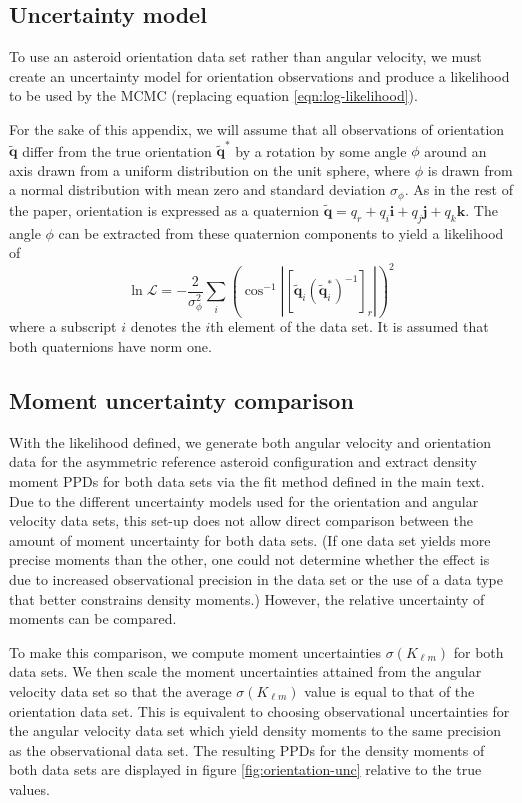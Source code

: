 \documentclass[fleqn,usenatbib]{mnras}
\newcommand{\parens}[1]{\left( #1 \right)}
\newcommand{\brackets}[1]{\left[ #1 \right]}
\newcommand{\quat}[1]{\widetilde{\bm{#1}}}
\begin{document}
\subsection{Uncertainty model}
To use an asteroid orientation data set rather than angular velocity, we must create an uncertainty model for orientation observations and produce a likelihood to be used by the MCMC (replacing equation \ref{eqn:log-likelihood}).

For the sake of this appendix, we will assume that all observations of orientation $\quat q$ differ from the true orientation $\quat q^*$ by a rotation by some angle $\phi$ around an axis drawn from a uniform distribution on the unit sphere, where $\phi$ is drawn from a normal distribution with mean zero and standard deviation $\sigma_\phi$. As in the rest of the paper, orientation is expressed as a quaternion $\quat q = q_r + q_i \bm i + q_j \bm j + q_k \bm k$. The angle $\phi$ can be extracted from these quaternion components to yield a likelihood of
\begin{equation}
  \ln \mathcal{L} = -\frac{2}{\sigma_\phi^2}\sum_{i}\parens{\cos^{-1}\left|\brackets{\quat q_i (\quat q_i^*)^{-1}}_r\right|}^2
  \label{eqn:orientation-like}
\end{equation}
where a subscript $i$ denotes the $i$th element of the data set. It is assumed that both quaternions have norm one.

\subsection{Moment uncertainty comparison}
With the likelihood defined, we generate both angular velocity and orientation data for the asymmetric reference asteroid configuration and extract density moment PPDs for both data sets via the fit method defined in the main text. Due to the different uncertainty models used for the orientation and angular velocity data sets, this set-up does not allow direct comparison between the amount of moment uncertainty for both data sets. (If one data set yields more precise moments than the other, one could not determine whether the effect is due to increased observational precision in the data set or the use of a data type that better constrains density moments.) However, the relative uncertainty of moments can be compared.

To make this comparison, we compute moment uncertainties $\sigma(K_{\ell m})$ for both data sets. We then scale the moment uncertainties attained from the angular velocity data set so that the average $\sigma(K_{\ell m})$ value is equal to that of the orientation data set. This is equivalent to choosing observational uncertainties for the angular velocity data set which yield density moments to the same precision as the observational data set. The resulting PPDs for the density moments of both data sets are displayed in figure \ref{fig:orientation-unc} relative to the true values.
\end{document}
